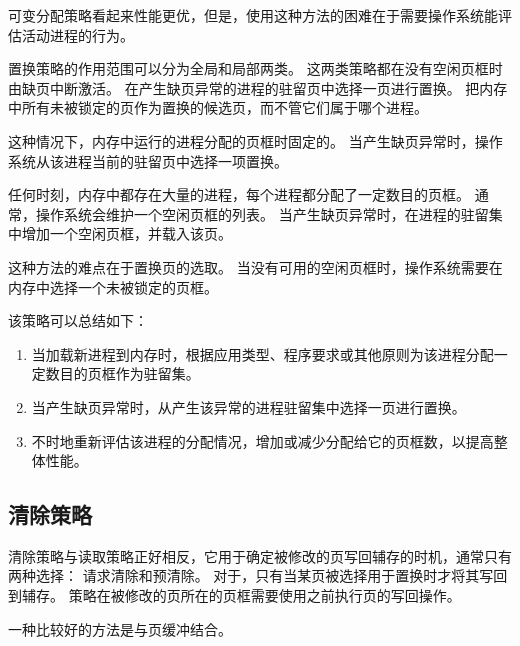 {{{            可变分配策略看起来性能更优，但是，使用这种方法的困难在于需要操作系统能评估活动进程的行为。
        }

        {
            置换策略的作用范围可以分为全局和局部两类。
            这两类策略都在没有空闲页框时由缺页中断激活。
            在产生缺页异常的进程的驻留页中选择一页进行置换。
            把内存中所有未被锁定的页作为置换的候选页，而不管它们属于哪个进程。
        }

        {
            这种情况下，内存中运行的进程分配的页框时固定的。
            当产生缺页异常时，操作系统从该进程当前的驻留页中选择一项置换。
        }

        {
            任何时刻，内存中都存在大量的进程，每个进程都分配了一定数目的页框。
            通常，操作系统会维护一个空闲页框的列表。
            当产生缺页异常时，在进程的驻留集中增加一个空闲页框，并载入该页。

            这种方法的难点在于置换页的选取。
            当没有可用的空闲页框时，操作系统需要在内存中选择一个未被锁定的页框。
        }

        {
            该策略可以总结如下：

            \begin{enumerate}
                \item 当加载新进程到内存时，根据应用类型、程序要求或其他原则为该进程分配一定数目的页框作为驻留集。
                \item 当产生缺页异常时，从产生该异常的进程驻留集中选择一页进行置换。
                \item 不时地重新评估该进程的分配情况，增加或减少分配给它的页框数，以提高整体性能。
            \end{enumerate}
        }
    }

    \subsection{清除策略}
    {
        清除策略与读取策略正好相反，它用于确定被修改的页写回辅存的时机，通常只有两种选择：
        请求清除和预清除。
        对于，只有当某页被选择用于置换时才将其写回到辅存。
        策略在被修改的页所在的页框需要使用之前执行页的写回操作。

        一种比较好的方法是与页缓冲结合。
    }

}
